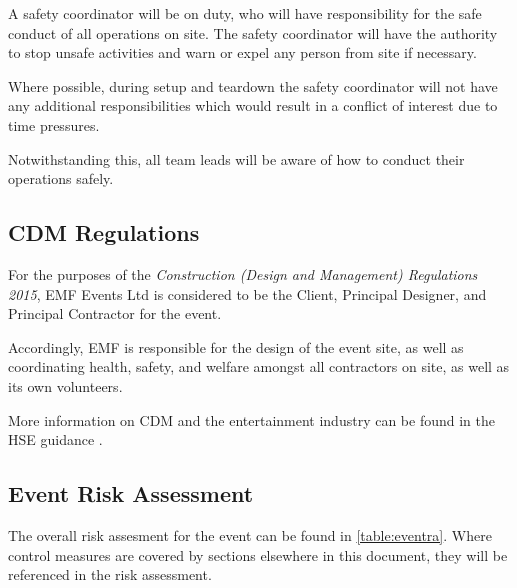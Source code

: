 A safety coordinator will be on duty, who will have responsibility for the
safe conduct of all operations on site. The safety coordinator will have the
authority to stop unsafe activities and warn or expel any person from site if
necessary.

Where possible, during setup and teardown the safety coordinator will not have
any additional responsibilities which would result in a conflict of interest due
to time pressures.

Notwithstanding this, all team leads will be aware of how to conduct their
operations safely.

\subsection{CDM Regulations}

For the purposes of the \textit{Construction (Design and Management) Regulations 2015},
EMF Events Ltd is considered to be the Client, Principal Designer,
and Principal Contractor for the event.

Accordingly, EMF is responsible for the design of the event site, as well as
coordinating health, safety, and welfare amongst all contractors on site, as well
as its own volunteers.

More information on CDM and the entertainment industry can be found in the HSE
guidance \cite{cdmguidance}.

\subsection{Event Risk Assessment}
The overall risk assesment for the event can be found in \cref{table:eventra}.
Where control measures are covered by sections elsewhere in this document, they
will be referenced in the risk assessment.


